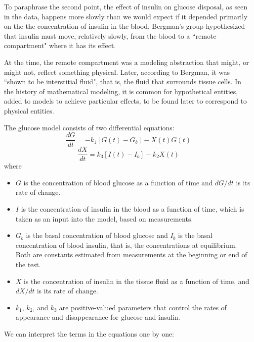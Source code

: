 \documentclass[12pt]{book}
\theoremstyle{exercise}
\begin{document}
To paraphrase the second point, the effect of insulin on glucose disposal, as seen in the data, happens more slowly than we would expect if it depended primarily on the the concentration of insulin in the blood.  Bergman's group hypothesized that insulin must move, relatively slowly, from the blood to a ``remote compartment" where it has its effect.

At the time, the remote compartment was a modeling abstraction that might, or might not, reflect something physical.  Later, according to Bergman, it was ``shown to be interstitial fluid", that is, the fluid that surrounds tissue cells.  In the history of mathematical modeling, it is common for hypothetical entities, added to models to achieve particular effects, to be found later to correspond to physical entities.

The glucose model consists of two differential equations:
%
\[ \frac{dG}{dt} = -k_1 \left[ G(t) - G_b \right] - X(t) G(t)  \]
%
\[ \frac{dX}{dt} = k_3 \left[I(t) - I_b \right] - k_2 X(t) \]
%
where

\begin{itemize}

\item $G$ is the concentration of blood glucose as a function of time and $dG/dt$ is its rate of change.

\item $I$ is the concentration of insulin in the blood as a function of time, which is taken as an input into the model, based on measurements.

\item $G_b$ is the basal concentration of blood glucose and $I_b$ is the basal concentration of blood insulin, that is, the concentrations at equilibrium.  Both are constants estimated from measurements at the beginning or end of the test.

\item $X$ is the concentration of insulin in the tissue fluid as a function of time, and $dX/dt$ is its rate of change.

\item $k_1$, $k_2$, and $k_3$ are positive-valued parameters that control the rates of appearance and disappearance for glucose and insulin. 

\end{itemize}

We can interpret the terms in the equations one by one:
\end{document}
